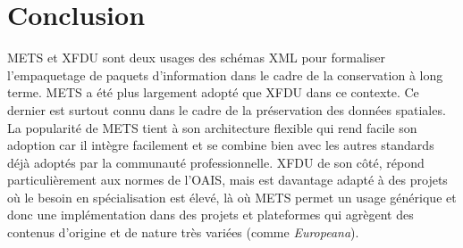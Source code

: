 \documentclass[12pt,a4paper]{article} %
\begin{document}
\section{Conclusion}
METS et XFDU sont deux usages des schémas XML pour formaliser l'empaquetage de paquets d'information dans le cadre de la conservation à long terme. METS a été plus largement adopté que XFDU dans ce contexte. Ce dernier est surtout connu dans le cadre de la préservation des données spatiales. La popularité de METS tient à son architecture flexible qui rend facile son adoption car il intègre facilement et se combine bien avec les autres standards déjà adoptés par la communauté professionnelle. XFDU de son côté, répond particulièrement aux normes de l'OAIS, mais est davantage adapté à des projets où le besoin en spécialisation est élevé, là où METS permet un usage générique et donc une implémentation dans des projets et plateformes qui agrègent des contenus d'origine et de nature très variées (comme \textit{Europeana}).

\printbibliography
\end{document}
